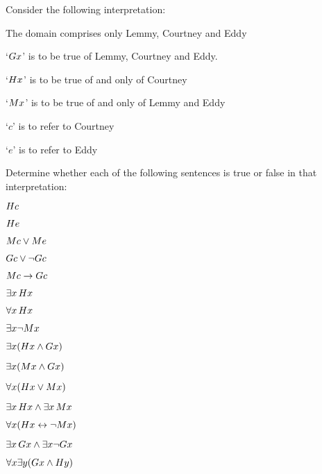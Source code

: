 \begin{practiceproblems}
\problempart
\label{pr.TorF2}
Consider the following interpretation:	
	\begin{ebullet}
		\item The domain comprises only Lemmy, Courtney and Eddy
		\item `$\mathord{G}x$' is to be true of Lemmy, Courtney and Eddy.
		\item `$\mathord{H}x$' is to be true of and only of Courtney
		\item `$\mathord{M}x$' is to be true of and only of Lemmy and Eddy
		\item `$c$' is to refer to Courtney
		\item `$e$' is to refer to Eddy
	\end{ebullet}
Determine whether each of the following sentences is true or false in that interpretation:
\begin{earg}
\item $\mathord{H}c$ \hfill {}
\item $\mathord{H}e$\hfill {}
\item $\mathord{M}c \vee \mathord{M}e$ \hfill {}
\item $\mathord{G}c \vee \neg \mathord{G}c$ \hfill {}
\item $\mathord{M}c \rightarrow \mathord{G}c$ \hfill {}
\item $\exists x\,\mathord{H}x$ \hfill {}
\item $\forall x\,\mathord{H}x$ \hfill {}
\item $\exists x \neg \mathord{M}x$ \hfill {}
\item $\exists x(\mathord{H}x \mathbin{\wedge} \mathord{G}x)$ \hfill {}
\item $\exists x(\mathord{M}x \mathbin{\wedge} \mathord{G}x)$ \hfill {}
\item $\forall x(\mathord{H}x \vee \mathord{M}x)$ \hfill {}
\item $\exists x\,\mathord{H}x \mathbin{\wedge} \exists x\,\mathord{M}x$ \hfill {}
\item $\forall x(\mathord{H}x \leftrightarrow \neg \mathord{M}x)$ \hfill {}
\item $\exists x\,\mathord{G}x \mathbin{\wedge} \exists x \neg \mathord{G}x$ \hfill {}
\item $\forall x\exists y(\mathord{G}x \mathbin{\wedge} \mathord{H}y)$ \hfill {}
\end{earg}


\end{practiceproblems}
